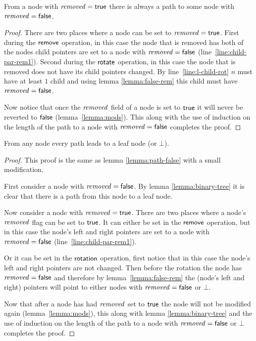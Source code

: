 \begin{lemma}
\label{lemma:path-false}
From a node with $\ms{removed}=\lit{true}$ there is always a path to some node with $\ms{removed}=\lit{false}$.
\end{lemma}
\begin{proof}
There are two places where a node can be set to $\ms{removed}=\lit{true}$.
First during the $\act{remove}$ operation, in this case the node that is removed has both of the nodes child pointers are set to a node
with $\ms{removed}=\lit{false}$ (line~\ref{line:child-par-rem1}).%
Second during the $\act{rotate}$ operation, in this case the node that is removed does not have its child pointers changed.
By line~\ref{line:l-child-rot} $n$ must have at least $1$ child and using lemma \ref{lemma:false-rem} this child must have $\ms{removed}=\lit{false}$.

Now notice that once the $\ms{removed}$ field of a node is set to $\lit{true}$ it will never be reverted to $\lit{false}$ (lemma~\ref{lemma:mods}).
This along with the use of induction on the length
of the path to a node with $\ms{removed}=\lit{false}$ completes the proof.
\end{proof}


\begin{lemma}
\label{lemma:path}
From any node every path leads to a leaf node (or $\bot$).
\end{lemma}
\begin{proof}
This proof is the same as lemma \ref{lemma:path-false} with a small modification.

First consider a node with $\ms{removed}=\lit{false}$.
By lemma \ref{lemma:binary-tree} 
it is clear that there is a path from this node to a leaf node.

Now consider a node with $\ms{removed}=\lit{true}$.
There are two places where a node's $\ms{removed}$ flag can be set to $\lit{true}$.
It can either be set in the $\act{remove}$ operation, but in this case the node's left and right pointers  are set to a node with $\ms{removed}=\lit{false}$ (line~\ref{line:child-par-rem1}).%

Or it can be set in the $\act{rotation}$ operation, first notice that in this case the node's left and right pointers are not changed.
Then before the rotation the node has $\ms{removed}=\lit{false}$ and therefore by lemma~\ref{lemma:false-rem} the (node's left and right) pointers will point
to either nodes with $\ms{removed}=\lit{false}$ or $\bot$.

Now that after a node has had $\ms{removed}$ set to $\lit{true}$ the node will not be modified again (lemma~\ref{lemma:mods}), this along with lemma \ref{lemma:binary-tree} and
the use of induction on the length of the path to a node with $\ms{removed}=\lit{false}$ or $\bot$ completes the proof.
\end{proof}

